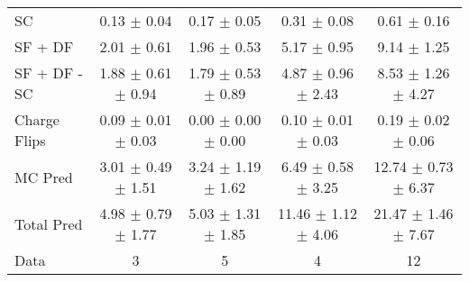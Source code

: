 \begin{tabular}{l|cccc}
                                 SC &  0.13 $\pm$  0.04 &  0.17 $\pm$  0.05 &  0.31 $\pm$  0.08 &  0.61 $\pm$  0.16 \\
                            SF + DF &  2.01 $\pm$  0.61 &  1.96 $\pm$  0.53 &  5.17 $\pm$  0.95 &  9.14 $\pm$  1.25 \\
\hline
                       SF + DF - SC &  1.88 $\pm$  0.61 $\pm$  0.94 &  1.79 $\pm$  0.53 $\pm$  0.89 &  4.87 $\pm$  0.96 $\pm$  2.43 &  8.53 $\pm$  1.26 $\pm$  4.27 \\
\hline\hline
                       Charge Flips &  0.09 $\pm$  0.01 $\pm$  0.03 &  0.00 $\pm$  0.00 $\pm$  0.00 &  0.10 $\pm$  0.01 $\pm$  0.03 &  0.19 $\pm$  0.02 $\pm$  0.06 \\
\hline
                            MC Pred &  3.01 $\pm$  0.49 $\pm$  1.51 &  3.24 $\pm$  1.19 $\pm$  1.62 &  6.49 $\pm$  0.58 $\pm$  3.25 & 12.74 $\pm$  0.73 $\pm$  6.37 \\
\hline
                         Total Pred &  4.98 $\pm$  0.79 $\pm$  1.77 &  5.03 $\pm$  1.31 $\pm$  1.85 & 11.46 $\pm$  1.12 $\pm$  4.06 & 21.47 $\pm$  1.46 $\pm$  7.67 \\
\hline\hline
                               Data &     3 &     5 &     4 &    12 \\
\hline\hline
\end{tabular}

